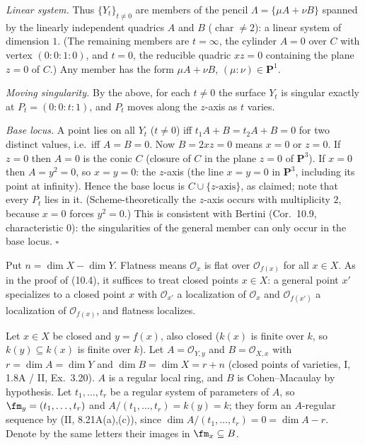 \documentclass[11pt]{article}
\begin{document}
\emph{Linear system.} Thus $\{Y_t\}_{t\ne0}$ are members of the pencil $\Lambda=\{\mu A+\nu B\}$ spanned by the linearly independent quadrics $A$ and $B$ ($\operatorname{char}\ne2$): a linear system of dimension $1$. (The remaining members are $t=\infty$, the cylinder $A=0$ over $C$ with vertex $(0:0:1:0)$, and $t=0$, the reducible quadric $xz=0$ containing the plane $z=0$ of $C$.) Any member has the form $\mu A+\nu B$, $(\mu:\nu)\in\mathbf P^1$.

\emph{Moving singularity.} By the above, for each $t\ne0$ the surface $Y_t$ is singular exactly at $P_t=(0:0:t:1)$, and $P_t$ moves along the $z$-axis as $t$ varies.

\emph{Base locus.} A point lies on all $Y_t$ ($t\ne0$) iff $t_1A+B=t_2A+B=0$ for two distinct values, i.e.\ iff $A=B=0$. Now $B=2xz=0$ means $x=0$ or $z=0$. If $z=0$ then $A=0$ is the conic $C$ (closure of $C$ in the plane $z=0$ of $\mathbf P^3$). If $x=0$ then $A=y^2=0$, so $x=y=0$: the $z$-axis (the line $x=y=0$ in $\mathbf P^3$, including its point at infinity). Hence the base locus is $C\cup\{z\text{-axis}\}$, as claimed; note that every $P_t$ lies in it. (Scheme-theoretically the $z$-axis occurs with multiplicity $2$, because $x=0$ forces $y^2=0$.) This is consistent with Bertini (Cor.~10.9, characteristic $0$): the singularities of the general member can only occur in the base locus. \hfill$\square$

\pf
Put $n=\dim X-\dim Y$. Flatness means $\mathcal O_x$ is flat over $\mathcal O_{f(x)}$ for all $x\in X$. As in the proof of (10.4), it suffices to treat closed points $x\in X$: a general point $x'$ specializes to a closed point $x$ with $\mathcal O_{x'}$ a localization of $\mathcal O_x$ and $\mathcal O_{f(x')}$ a localization of $\mathcal O_{f(x)}$, and flatness localizes.

Let $x\in X$ be closed and $y=f(x)$, also closed ($k(x)$ is finite over $k$, so $k(y)\subseteq k(x)$ is finite over $k$). Let $A=\mathcal O_{Y,y}$ and $B=\mathcal O_{X,x}$ with $r=\dim A=\dim Y$ and $\dim B=\dim X=r+n$ (closed points of varieties, I, 1.8A / II, Ex.~3.20). $A$ is a regular local ring, and $B$ is Cohen--Macaulay by hypothesis. Let $t_1,\dots,t_r$ be a regular system of parameters of $A$, so $\fm_y=(t_1,\dots,t_r)$ and $A/(t_1,\dots,t_r)=k(y)=k$; they form an $A$-regular sequence by (II, 8.21A(a),(c)), since $\dim A/(t_1,\dots,t_r)=0=\dim A-r$. Denote by the same letters their images in $\fm_x\subseteq B$.
\end{document}
